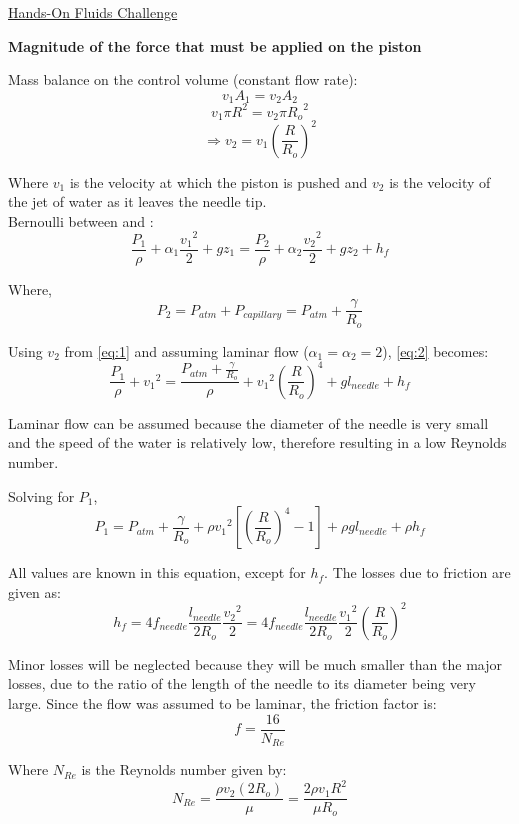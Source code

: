 \documentclass{article}
\newcommand*\circled[1]{\tikz[baseline=(char.base)]{
            \node[shape=circle,draw,inner sep=2pt] (char) {#1};}}
\begin{document}
\begin{center}\underline{\huge Hands-On Fluids Challenge}\end{center}

\textbf{Magnitude of the force that must be applied on the piston}

Mass balance on the control volume (constant flow rate):
\[ v_{1}A_{1} = v_{2}A_{2} \]
\[ v_{1}\pi{R}^2 = v_{2}\pi{R_{o}}^2 \]
\[ \Rightarrow v_{2} = v_{1} \left(\frac{R}{R_{o}}\right)^2 \tag{1} \label{eq:1} \]

Where $v_{1}$ is the velocity at which the piston is pushed and $v_{2}$ is the velocity of the jet of water as it leaves the needle tip. \\

Bernoulli between \circled{1} and \circled{2}:
\[ \frac{P_{1}}{\rho} + \alpha_{1}\frac{{v_{1}}^2}{2}  + gz_{1} = \frac{P_{2}}{\rho} + \alpha_{2}\frac{{v_{2}}^2}{2}  + gz_{2} + h_{f} \tag{2} \label{eq:2} \]

Where,
\[ P_{2} = P_{atm} + P_{capillary}  = P_{atm} + \frac{\gamma}{R_{o}} \]


Using $v_{2}$ from \eqref{eq:1} and assuming laminar flow ($\alpha_{1} = \alpha_{2} = 2$), \eqref{eq:2} becomes:
\[ \frac{P_{1}}{\rho} + {v_{1}}^2 = \frac{P_{atm} + \frac{\gamma}{R_{o}}}{\rho} + {v_{1}}^2\left(\frac{R}{R_{o}}\right)^4  + gl_{needle} + h_{f} \]

Laminar flow can be assumed because the diameter of the needle is very small and the speed of the water is relatively low, therefore resulting in a low Reynolds number.

Solving for $P_{1}$,
\[ P_{1} = P_{atm} + \frac{\gamma}{R_{o}} + \rho{v_{1}}^2\left[\left(\frac{R}{R_{o}}\right)^4  - 1 \right] + \rho gl_{needle} + \rho h_{f} \tag{3} \label{eq:3} \]

All values are known in this equation, except for $h_{f}$. The losses due to friction are given as:
\[ h_{f} = 4f_{needle} \frac{l_{needle}}{2R_{o}} \frac{{v_{2}}^2}{2} = 4f_{needle} \frac{l_{needle}}{2R_{o}} \frac{{v_{1}}^2}{2} \left(\frac{R}{R_{o}}\right)^2 \tag{4} \label{eq:4} \]

Minor losses will be neglected because they will be much smaller than the major losses, due to the ratio of the length of the needle to its diameter being very large. Since the flow was assumed to be laminar, the friction factor is:
\[ f = \frac{16}{N_{Re}} \tag{5} \label{eq:5} \]

Where $N_{Re}$ is the Reynolds number given by:
\[ N_{Re} = \frac{\rho v_{2} (2R_{o})}{\mu} = \frac{2 \rho v_{1} R^{2}}{\mu R_{o}} \tag{6} \label{eq:6} \]
\end{document}
